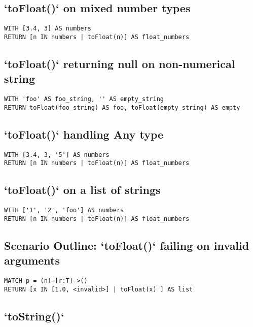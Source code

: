 \subsection{`toFloat()` on mixed number types}

\begin{lstlisting}
WITH [3.4, 3] AS numbers
RETURN [n IN numbers | toFloat(n)] AS float_numbers
\end{lstlisting}

\subsection{`toFloat()` returning null on non-numerical string}

\begin{lstlisting}
WITH 'foo' AS foo_string, '' AS empty_string
RETURN toFloat(foo_string) AS foo, toFloat(empty_string) AS empty
\end{lstlisting}

\subsection{`toFloat()` handling Any type}

\begin{lstlisting}
WITH [3.4, 3, '5'] AS numbers
RETURN [n IN numbers | toFloat(n)] AS float_numbers
\end{lstlisting}

\subsection{`toFloat()` on a list of strings}

\begin{lstlisting}
WITH ['1', '2', 'foo'] AS numbers
RETURN [n IN numbers | toFloat(n)] AS float_numbers
\end{lstlisting}

\subsection{Scenario Outline: `toFloat()` failing on invalid arguments}

\begin{lstlisting}
MATCH p = (n)-[r:T]->()
RETURN [x IN [1.0, <invalid>] | toFloat(x) ] AS list
\end{lstlisting}

\subsection{`toString()`}

